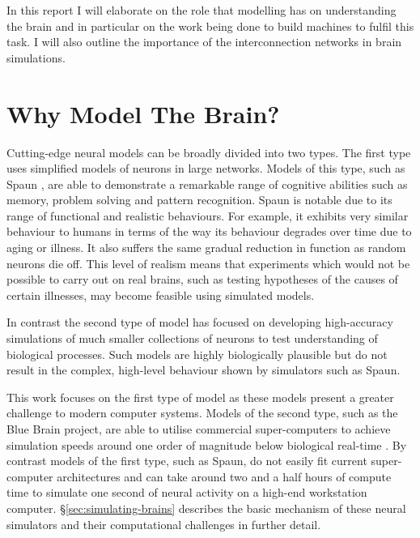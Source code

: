 	In this report I will elaborate on the role that modelling has on
	understanding the brain and in particular on the work being done to build
	machines to fulfil this task. I will also outline the importance of the
	interconnection networks in brain simulations.
	
	\section{Why Model The Brain?}
	
		
		
		Cutting-edge neural models can be broadly divided into two types. The first
		type uses simplified models of neurons in large networks. Models of this
		type, such as Spaun \cite{eliasmith12}, are able to demonstrate a remarkable
		range of cognitive abilities such as memory, problem solving and pattern
		recognition. Spaun is notable due to its range of functional and realistic
		behaviours. For example, it exhibits very similar behaviour to humans in
		terms of the way its behaviour degrades over time due to aging or illness.
		It also suffers the same gradual reduction in function as random neurons die
		off. This level of realism means that experiments which would not be
		possible to carry out on real brains, such as testing hypotheses of the
		causes of certain illnesses, may become feasible using simulated models.
		
		In contrast the second type of model has focused on developing
		high-accuracy simulations of much smaller collections of neurons to test
		understanding of biological processes. Such models are highly biologically
		plausible but do not result in the complex, high-level behaviour shown by
		simulators such as Spaun.
		
		This work focuses on the first type of model as these models present a
		greater challenge to modern computer systems. Models of the second type,
		such as the Blue Brain project, are able to utilise commercial
		super-computers to achieve simulation speeds around one order of magnitude
		below biological real-time \cite{markram06}. By contrast models of the first
		type, such as Spaun, do not easily fit current super-computer architectures
		and can take around two and a half hours of compute time to simulate one
		second of neural activity on a high-end workstation computer.
		\S\ref{sec:simulating-brains} describes the basic mechanism of these neural
		simulators and their computational challenges in further detail.
	
